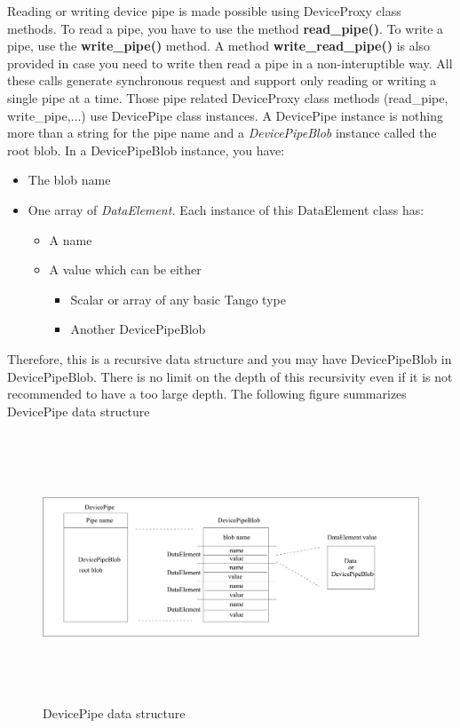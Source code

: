 Reading or writing device pipe is made possible using DeviceProxy
class methods. To read a pipe, you have to use the method \textbf{read\_pipe()}.
To write a pipe, use the \textbf{write\_pipe()} method. A method \textbf{write\_read\_pipe()}
is also provided in case you need to write then read a pipe in a non-interuptible
way. All these calls generate synchronous request and support only
reading or writing a single pipe at a time. Those pipe related DeviceProxy
class methods (read\_pipe, write\_pipe,...) use DevicePipe class instances.
A DevicePipe instance is nothing more than a string
for the pipe name and a \emph{DevicePipeBlob} instance called the
root blob. In a DevicePipeBlob instance, you
have:
\begin{itemize}
\item The blob name
\item One array of \emph{DataElement. }Each instance of this DataElement
class has:

\begin{itemize}
\item A name
\item A value which can be either

\begin{itemize}
\item Scalar or array of any basic Tango type
\item Another DevicePipeBlob
\end{itemize}
\end{itemize}
\end{itemize}
Therefore, this is a recursive data structure and you may have DevicePipeBlob
in DevicePipeBlob. There is no limit on the depth of this recursivity
even if it is not recommended to have a too large depth. The following
figure summarizes DevicePipe data structure
\begin{figure}[H]
\begin{centering}
\includegraphics[width=14cm,height=8cm]{gen_api/pipe}
\par\end{centering}

\protect\caption{DevicePipe data structure}
\label{ }
\end{figure}


